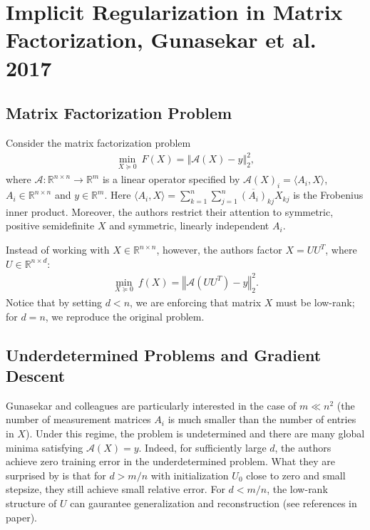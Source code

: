 \documentclass{article}
\begin{document}
\section{Implicit Regularization in Matrix Factorization, Gunasekar et al. 2017}
\subsection{Matrix Factorization Problem}
Consider the matrix factorization problem
\begin{align*}
    \underset{X \succeq 0}{\min} \ F(X) = \left\Vert \mathcal{A}(X) - y \right\Vert_2^2,
\end{align*}
where $\mathcal{A}: \mathbb{R}^{n \times n} \rightarrow \mathbb{R}^m$ is a linear operator specified by $\mathcal{A}(X)_i = \langle A_i, X \rangle$, $A_i \in \mathbb{R}^{n \times n}$ and $y \in \mathbb{R}^m$. Here $\langle A_i, X \rangle = \sum_{k=1}^n \sum_{j=1}^n \overline{(A_i)}_{kj} X_{kj}$ is the Frobenius inner product. Moreover, the authors restrict their attention to symmetric, positive semidefinite $X$ and symmetric, linearly independent $A_i$.

Instead of working with $X \in \mathbb{R}^{n \times n}$, however, the authors factor $X = UU^T$, where $U \in \mathbb{R}^{n \times d}$:
\begin{align*}
    \underset{X \succeq 0}{\min} \ f(X) = \left\Vert \mathcal{A}(UU^T) - y \right\Vert_2^2.
\end{align*}
Notice that by setting $d < n$, we are enforcing that matrix $X$ must be low-rank; for $d = n$, we reproduce the original problem.

\subsection{Underdetermined Problems and Gradient Descent}
Gunasekar and colleagues are particularly interested in the case of $m \ll n^2$ (the number of measurement matrices $A_i$ is much smaller than the number of entries in $X$). Under this regime, the problem is undetermined and there are many global minima satisfying $\mathcal{A}(X) = y$. Indeed, for sufficiently large $d$, the authors achieve zero training error in the underdetermined problem. What they are surprised by is that for $d > m/n$ with initialization $U_0$ close to zero and small stepsize, they still achieve small relative error. For $d < m/n$, the low-rank structure of $U$ can gaurantee generalization and reconstruction (see references in paper). 
\end{document}
